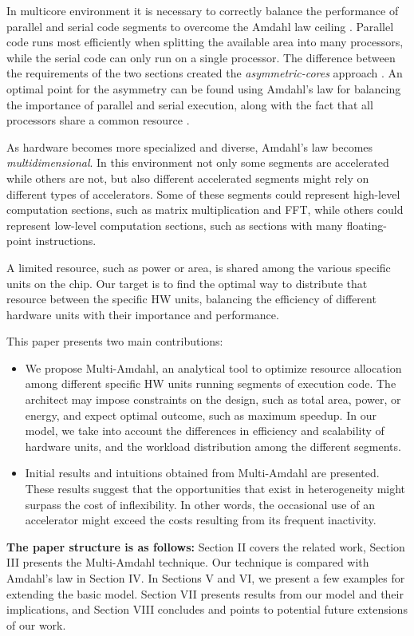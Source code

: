 \documentclass[twocolumn,english]{IEEEtran}
\begin{document}
In multicore environment it is necessary to correctly balance the
performance of parallel and serial code segments to overcome the Amdahl
law ceiling \cite{AmdahlsLaw}. Parallel code runs most efficiently
when splitting the available area into many processors, while the
serial code can only run on a single processor. The difference between
the requirements of the two sections created the \textit{asymmetric-cores}
approach \cite{ACCMP-Asymme}. An optimal point for the asymmetry
can be found using Amdahl's law for balancing the importance of parallel
and serial execution, along with the fact that all processors share
a common resource \cite{hill2008amdahl}. 

As hardware becomes more specialized and diverse, Amdahl's law becomes
\textit{multidimensional}. In this environment not only some segments
are accelerated while others are not, but also different accelerated
segments might rely on different types of accelerators. Some of these
segments could represent high-level computation sections, such as
matrix multiplication and FFT, while others could represent low-level
computation sections, such as sections with many floating-point instructions.

A limited resource, such as power or area, is shared among the various
specific units on the chip. Our target is to find the optimal way
to distribute that resource between the specific HW units, balancing
the efficiency of different hardware units with their importance and
performance.

This paper presents two main contributions: 
\begin{itemize}
\item We propose Multi-Amdahl, an analytical tool to optimize resource allocation
among  different specific HW units running  segments of execution
code. The architect may impose constraints on the design, such as
total area, power, or energy, and expect optimal outcome, such as
maximum speedup. In our model, we take into account the differences
in efficiency and scalability of hardware units, and the workload
distribution among the different segments. 
\item Initial results and intuitions obtained from Multi-Amdahl are presented.
These results suggest that the opportunities that exist in heterogeneity
might surpass the cost of inflexibility. In other words, the occasional
use of an accelerator might exceed the costs resulting from its frequent
inactivity.
\end{itemize}
\textbf{The paper structure is as follows:} Section II covers the
related work, Section III presents the Multi-Amdahl technique. Our
technique is compared with Amdahl's law in Section IV. In Sections
V and VI, we present a few examples for extending the basic model.
Section VII presents results from our model and their implications,
and Section VIII concludes and points to potential future extensions
of our work.
\end{document}
